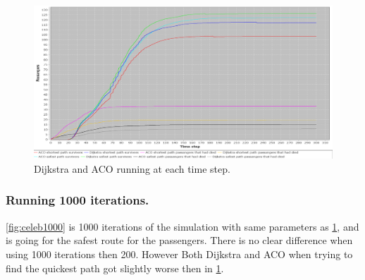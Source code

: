 


\begin{figure} [float]
\centering
\hspace*{-1.0in}
\includegraphics[scale=0.35]{images/Graph-using-200-rounds-140-passangers-and-one-fire.png}
\caption{Dijkstra and ACO running at each time step.}
\label{fig:celeb}
\end{figure}

\subsubsection{Running 1000 iterations.}
\ref{fig:celeb1000} is 1000 iterations of the simulation with same parameters as \ref{fig:celeb}, and is going for the safest route for the passengers. There is no clear difference when using 1000 iterations then 200. However Both Dijkstra and ACO when trying to find the quickest path got slightly worse then in \ref{fig:celeb}.

